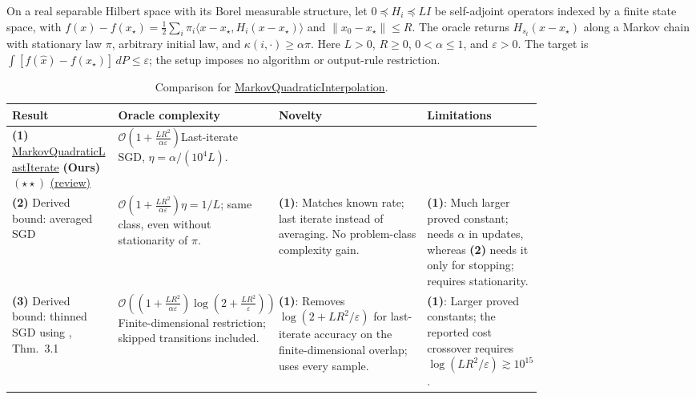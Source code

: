 \begin{table}[tp]
\centering
\caption{Comparison for \href{https://github.com/k3nfalt/longtails/blob/main/LongTails/Setups/MarkovQuadraticInterpolation.lean}{MarkovQuadraticInterpolation}.}\label{tab:MarkovQuadraticInterpolation}
\parbox{\linewidth}{\footnotesize On a real separable Hilbert space with its Borel measurable structure, let $0\preceq H_i\preceq LI$ be self-adjoint operators indexed by a finite state space, with $f(x)-f(x_\star)=\frac12\sum_i\pi_i\langle x-x_\star,H_i(x-x_\star)\rangle$ and $\|x_0-x_\star\|\le R$. The oracle returns $H_{s_t}(x-x_\star)$ along a Markov chain with stationary law $\pi$, arbitrary initial law, and $\kappa(i,\cdot)\ge\alpha\pi$. Here $L>0$, $R\ge0$, $0<\alpha\le1$, and $\varepsilon>0$. The target is $\int[f(\widehat x)-f(x_\star)]\,dP\le\varepsilon$; the setup imposes no algorithm or output-rule restriction.}\par\smallskip
\begin{threeparttable}
\footnotesize
\setlength{\tabcolsep}{4pt}\renewcommand{\arraystretch}{1.25}
\begin{tabularx}{\linewidth}{@{}>{\raggedright\arraybackslash}p{0.20\linewidth}>{\raggedright\arraybackslash}p{0.29\linewidth}>{\raggedright\arraybackslash}p{0.28\linewidth}>{\raggedright\arraybackslash}X@{}}
\toprule
\textbf{Result} & \textbf{Oracle complexity} & \textbf{Novelty} & \textbf{Limitations} \\
\midrule
\textbf{(1)} \href{https://github.com/k3nfalt/longtails/blob/main/LongTails/Theorems/MarkovQuadraticLastIterate.lean}{Markov\allowbreak Quadratic\allowbreak Last\allowbreak Iterate} \textbf{(Ours)} $(\star\star)$ \href{https://github.com/k3nfalt/longtails/blob/main/scripts/reviews/MarkovQuadraticLastIterate.md}{(review)} & $\mathcal{O}\!\left(1+\frac{LR^2}{\alpha\varepsilon}\right)$\newline Last-iterate SGD, $\eta=\alpha/(10^4L)$. & & \\
\midrule[1.2pt]
\textbf{(2)} Derived bound: averaged SGD & $\mathcal{O}\!\left(1+\frac{LR^2}{\alpha\varepsilon}\right)$\newline $\eta=1/L$; same class, even without stationarity of $\pi$. & \textbf{(1)}: Matches known rate; last iterate instead of averaging. No problem-class complexity gain. & \textbf{(1)}: Much larger proved constant; needs $\alpha$ in updates, whereas \textbf{(2)} needs it only for stopping; requires stationarity. \\
\midrule
\textbf{(3)} Derived bound: thinned SGD using \citep{mqDereziDong2026v1}, Thm.~3.1 & $\mathcal{O}\!\left(\left(1+\frac{LR^2}{\alpha\varepsilon}\right)\log\left(2+\frac{LR^2}{\varepsilon}\right)\right)$\newline Finite-dimensional restriction; skipped transitions included. & \textbf{(1)}: Removes $\log(2+LR^2/\varepsilon)$ for last-iterate accuracy on the finite-dimensional overlap; uses every sample. & \textbf{(1)}: Larger proved constants; the reported cost crossover requires $\log(LR^2/\varepsilon)\gtrsim10^{15}$. \\

\end{tabularx}
\end{threeparttable}
\end{table}
